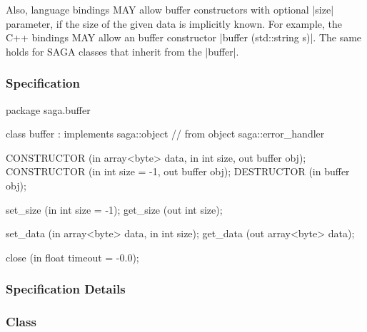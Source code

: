  Also, language bindings MAY allow buffer constructors with
 optional |size| parameter, if the size of the given data is
 implicitly known.  For example, the C++ bindings MAY allow an
 buffer constructor |buffer (std::string s)|.  The same holds
 for SAGA classes that inherit from the |buffer|.
 
 \newpage
 
 \subsubsection{Specification}
 
 \begin{myspec}
  package saga.buffer
  {
    class buffer : implements   saga::object
                // from object  saga::error_handler
    {
      CONSTRUCTOR (in  array<byte>  data,
                   in  int          size,
                   out buffer       obj);
      CONSTRUCTOR (in  int          size = -1,
                   out buffer       obj);
      DESTRUCTOR  (in  buffer       obj);
 
      set_size    (in  int          size = -1);
      get_size    (out int          size);
 
      set_data    (in  array<byte>  data, 
                   in  int          size);
      get_data    (out array<byte>  data);
 
      close       (in  float        timeout = -0.0);
    }
  }
 \end{myspec}
 
 
 \subsubsection{Specification Details}
 
 \subsubsection*{Class }
 
